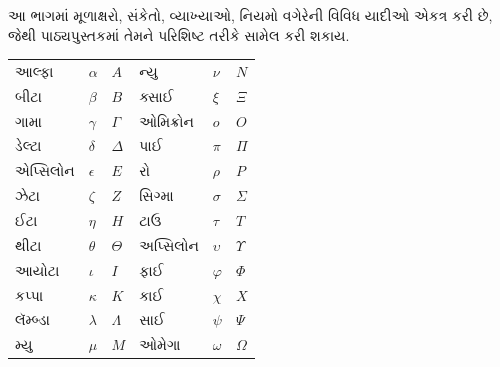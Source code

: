 
\label{guunit:OLP-0640}


\begin{editorial}
  આ ભાગમાં મૂળાક્ષરો, સંકેતો, વ્યાખ્યાઓ,
  નિયમો વગેરેની વિવિધ યાદીઓ એકત્ર કરી છે,
  જેથી પાઠ્યપુસ્તકમાં તેમને પરિશિષ્ટ
  તરીકે સામેલ કરી શકાય.
\end{editorial}

\begingroup
\makeatletter{}\makeatother

\label{guunit:OLP-0641}


\begin{center}
    \begin{tabular}{lll@{\qquad}lll}
    આલ્ફા &	$\alpha$ & $A$ &
    ન્યુ & $\nu$ & $N$ \\
    બીટા & $\beta$ & $B$ &
    ક્સાઈ & $\xi$ & $\Xi$ \\
    ગામા &	$\gamma$ & $\Gamma$ &
    ઓમિક્રોન & $o$ & $O$ \\
    ડેલ્ટા & $\delta$ & $\Delta$ &
    પાઈ & $\pi$ & $\Pi$ \\
    એપ્સિલોન & $\epsilon$ & $E$ &
    રો & $\rho$ & $P$ \\
    ઝેટા & $\zeta$ & $Z$ &
    સિગ્મા &	$\sigma$ & $\Sigma$ \\
    ઈટા & $\eta$ & $H$ &
    ટાઉ & $\tau$ & $T$ \\
    થીટા & $\theta$ & $\Theta$ &
    અપ્સિલોન & $\upsilon$ & $\Upsilon$ \\
    આયોટા & $\iota$ & $I$ &
    ફાઈ & $\varphi$ & $\Phi$ \\
    કપ્પા & $\kappa$ & $K$ &
    કાઈ & $\chi$ & $X$ \\
    લૅમ્બ્ડા & $\lambda$ & $\Lambda$ &
    સાઈ & $\psi$ & $\Psi$ \\
    મ્યુ & $\mu$ & $M$ &
    ઓમેગા & $\omega$ & $\Omega$
    \end{tabular}
\end{center}
\endgroup


\begingroup
\makeatletter{}\makeatother

\label{guunit:OLP-0642}


